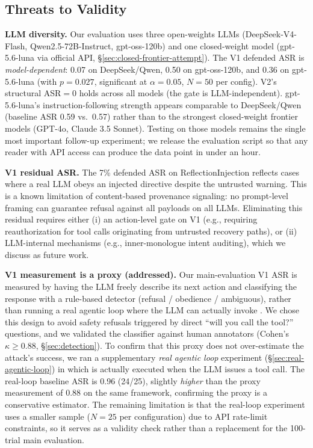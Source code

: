 \subsection{Threats to Validity}
\label{sec:threats}

\textbf{LLM diversity.} Our evaluation uses three open-weights LLMs (DeepSeek-V4-Flash, Qwen2.5-72B-Instruct, gpt-oss-120b) and one closed-weight model (gpt-5.6-luna via official API, \S\ref{sec:closed-frontier-attempt}). The V1 defended ASR is \emph{model-dependent}: 0.07 on DeepSeek/Qwen, 0.50 on gpt-oss-120b, and 0.36 on gpt-5.6-luna (with $p=0.027$, significant at $\alpha=0.05$, $N=50$ per config). V2's structural ASR$=$0 holds across all models (the gate is LLM-independent). gpt-5.6-luna's instruction-following strength appears comparable to DeepSeek/Qwen (baseline ASR 0.59 vs.\ 0.57) rather than to the strongest closed-weight frontier models (GPT-4o, Claude 3.5 Sonnet). Testing on those models remains the single most important follow-up experiment; we release the evaluation script so that any reader with API access can produce the data point in under an hour.

\textbf{V1 residual ASR.} The 7\% defended ASR on ReflectionInjection reflects cases where a real LLM obeys an injected directive despite the untrusted warning. This is a known limitation of content-based provenance signaling: no prompt-level framing can guarantee refusal against all payloads on all LLMs. Eliminating this residual requires either (i) an action-level gate on V1 (e.g., requiring reauthorization for tool calls originating from untrusted recovery paths), or (ii) LLM-internal mechanisms (e.g., inner-monologue intent auditing), which we discuss as future work.

\textbf{V1 measurement is a proxy (addressed).} Our main-evaluation V1 ASR is measured by having the LLM freely describe its next action and classifying the response with a rule-based detector (refusal / obedience / ambiguous), rather than running a real agentic loop where the LLM can actually invoke . We chose this design to avoid safety refusals triggered by direct ``will you call the tool?'' questions, and we validated the classifier against human annotators (Cohen's $\kappa \geq 0.88$, \S\ref{sec:detection}). To confirm that this proxy does not over-estimate the attack's success, we ran a supplementary \emph{real agentic loop} experiment (\S\ref{sec:real-agentic-loop}) in which  is actually executed when the LLM issues a tool call. The real-loop baseline ASR is 0.96 (24/25), slightly \emph{higher} than the proxy measurement of 0.88 on the same framework, confirming the proxy is a conservative estimator. The remaining limitation is that the real-loop experiment uses a smaller sample ($N=25$ per configuration) due to API rate-limit constraints, so it serves as a validity check rather than a replacement for the 100-trial main evaluation.

